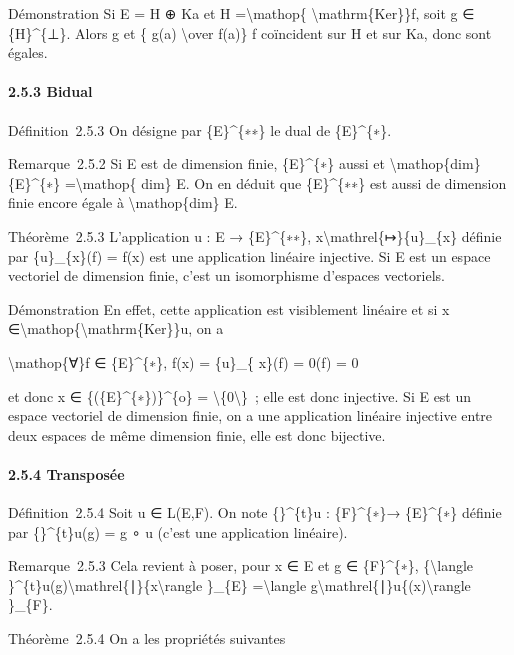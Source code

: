 \documentclass[]{article}
\begin{document}
Démonstration Si E = H ⊕ Ka et H =\textbackslash{}mathop\{
\textbackslash{}mathrm\{Ker\}\}f, soit g ∈ \{H\}\^{}\{⊥\}. Alors g et \{
g(a) \textbackslash{}over f(a)\} f coïncident sur H et sur Ka, donc sont
égales.

\paragraph{2.5.3 Bidual}

Définition~2.5.3 On désigne par \{E\}\^{}\{∗∗\} le dual de
\{E\}\^{}\{∗\}.

Remarque~2.5.2 Si E est de dimension finie, \{E\}\^{}\{∗\} aussi et
\textbackslash{}mathop\{dim\} \{E\}\^{}\{∗\} =\textbackslash{}mathop\{
dim\} E. On en déduit que \{E\}\^{}\{∗∗\} est aussi de dimension finie
encore égale à \textbackslash{}mathop\{dim\} E.

Théorème~2.5.3 L'application u : E → \{E\}\^{}\{∗∗\},
x\textbackslash{}mathrel\{↦\}\{u\}\_\{x\} définie par \{u\}\_\{x\}(f) =
f(x) est une application linéaire injective. Si E est un espace
vectoriel de dimension finie, c'est un isomorphisme d'espaces
vectoriels.

Démonstration En effet, cette application est visiblement linéaire et si
x ∈\textbackslash{}mathop\{\textbackslash{}mathrm\{Ker\}\}u, on a

\textbackslash{}mathop\{∀\}f ∈ \{E\}\^{}\{∗\}, f(x) = \{u\}\_\{ x\}(f) =
0(f) = 0

et donc x ∈ \{(\{E\}\^{}\{∗\})\}\^{}\{o\} =
\textbackslash{}\{0\textbackslash{}\}~; elle est donc injective. Si E
est un espace vectoriel de dimension finie, on a une application
linéaire injective entre deux espaces de même dimension finie, elle est
donc bijective.

\paragraph{2.5.4 Transposée}

Définition~2.5.4 Soit u ∈ L(E,F). On note \{\}\^{}\{t\}u :
\{F\}\^{}\{∗\}→ \{E\}\^{}\{∗\} définie par \{\}\^{}\{t\}u(g) = g ∘ u
(c'est une application linéaire).

Remarque~2.5.3 Cela revient à poser, pour x ∈ E et g ∈ \{F\}\^{}\{∗\},
\{\textbackslash{}langle
\}\^{}\{t\}u(g)\textbackslash{}mathrel\{∣\}\{x\textbackslash{}rangle
\}\_\{E\} =\textbackslash{}langle
g\textbackslash{}mathrel\{∣\}u\{(x)\textbackslash{}rangle \}\_\{F\}.

Théorème~2.5.4 On a les propriétés suivantes
\end{document}

